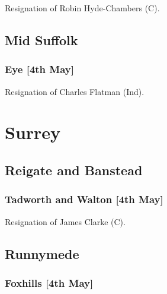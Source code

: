 \documentclass[a4paper,openany]{book}
\begin{document}
\begin{resultsiii}

Resignation of Robin Hyde-Chambers (C).

\subsection*{Mid Suffolk}

\subsubsection*{Eye \hspace*{\fill}\nolinebreak[1]%
\enspace\hspace*{\fill}
[4th May]}


Resignation of Charles Flatman (Ind).

\section{Surrey}

\subsection*{Reigate and Banstead}

\subsubsection*{Tadworth and Walton \hspace*{\fill}\nolinebreak[1]%
\enspace\hspace*{\fill}
[4th May]}


Resignation of James Clarke (C).

\subsection*{Runnymede}

\subsubsection*{Foxhills \hspace*{\fill}\nolinebreak[1]%
\enspace\hspace*{\fill}
[4th May]}


\end{resultsiii}
\end{document}
